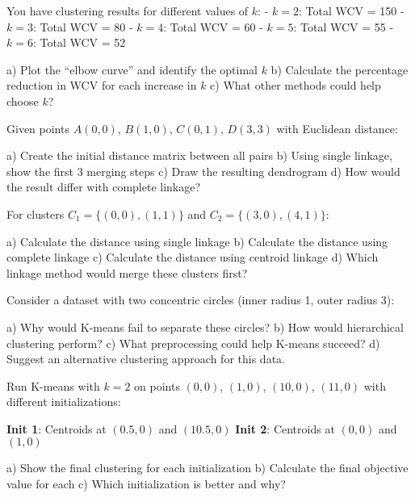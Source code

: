 \documentclass{article}
\newcounter{exercise}
\begin{document}
\begin{tcolorbox}[colback=gray!5!white,colframe=gray!75!black,title=Problem \stepcounter{exercise}: Choosing Optimal K]

You have clustering results for different values of $k$:
- $k=2$: Total WCV = 150
- $k=3$: Total WCV = 80  
- $k=4$: Total WCV = 60
- $k=5$: Total WCV = 55
- $k=6$: Total WCV = 52

a) Plot the ``elbow curve'' and identify the optimal $k$
b) Calculate the percentage reduction in WCV for each increase in $k$
c) What other methods could help choose $k$?
\end{tcolorbox}

\begin{tcolorbox}[colback=gray!5!white,colframe=gray!75!black,title=Problem \stepcounter{exercise}: Hierarchical Clustering Steps]

Given points $A(0,0)$, $B(1,0)$, $C(0,1)$, $D(3,3)$ with Euclidean distance:

a) Create the initial distance matrix between all pairs
b) Using single linkage, show the first 3 merging steps
c) Draw the resulting dendrogram
d) How would the result differ with complete linkage?
\end{tcolorbox}

\begin{tcolorbox}[colback=gray!5!white,colframe=gray!75!black,title=Problem \stepcounter{exercise}: Linkage Criteria Comparison]

For clusters $C_1 = \{(0,0), (1,1)\}$ and $C_2 = \{(3,0), (4,1)\}$:

a) Calculate the distance using single linkage
b) Calculate the distance using complete linkage  
c) Calculate the distance using centroid linkage
d) Which linkage method would merge these clusters first?
\end{tcolorbox}

\begin{tcolorbox}[colback=gray!5!white,colframe=gray!75!black,title=Problem \stepcounter{exercise}: K-Means Limitations]

Consider a dataset with two concentric circles (inner radius 1, outer radius 3):

a) Why would K-means fail to separate these circles?
b) How would hierarchical clustering perform?
c) What preprocessing could help K-means succeed?
d) Suggest an alternative clustering approach for this data.
\end{tcolorbox}

\begin{tcolorbox}[colback=gray!5!white,colframe=gray!75!black,title=Problem \stepcounter{exercise}: Initialization Effects]

Run K-means with $k=2$ on points $(0,0)$, $(1,0)$, $(10,0)$, $(11,0)$ with different initializations:

\textbf{Init 1}: Centroids at $(0.5, 0)$ and $(10.5, 0)$
\textbf{Init 2}: Centroids at $(0, 0)$ and $(1, 0)$

a) Show the final clustering for each initialization
b) Calculate the final objective value for each
c) Which initialization is better and why?
\end{tcolorbox}
\end{document}
